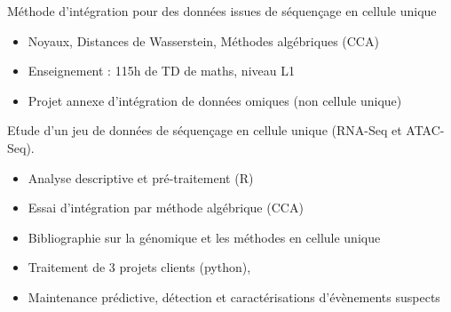 \documentclass[10pt,a4paper]{altacv}
\begin{document}

 Méthode d'intégration pour des données issues de séquençage en cellule unique
\begin{itemize}
\item Noyaux, Distances de Wasserstein, Méthodes algébriques (CCA)
\item Enseignement : 115h de TD de maths, niveau L1
\item Projet annexe d'intégration de données omiques (non cellule unique)
\end{itemize}

E\'tude d'un jeu de données de séquençage en cellule unique (RNA-Seq et ATAC-Seq). 
\begin{itemize}
\item Analyse descriptive et pré-traitement (R) 
\item Essai d'intégration par méthode algébrique (CCA) 
\item Bibliographie sur la génomique et les méthodes en cellule unique
\end{itemize}

{}

\begin{itemize}
\item Traitement de 3 projets clients (python), 
\item Maintenance prédictive, détection et caractérisations d'évènements suspects
\end{itemize}
\end{document}
